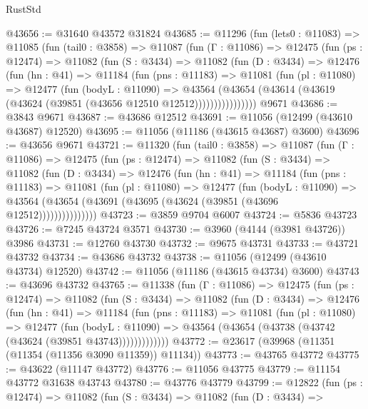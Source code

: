 \begin{lexlean}{RustStd}
\begin{coremodule}
@43656 := @31640 @43572 @31824
@43685 := @11296
    (fun (lets0 : @11083) =>
    @11085
      (fun (tail0 : @3858) =>
      @11087
        (fun (Γ : @11086) =>
        @12475
          (fun (ps : @12474) =>
          @11082
            (fun (S : @3434) =>
            @11082
              (fun (D : @3434) =>
              @12476
                (fun (hn : @41) =>
                @11184
                  (fun (pns : @11183) =>
                  @11081
                    (fun (pl : @11080) =>
                    @12477
                      (fun (bodyL : @11090) =>
                      @43564
                        (@43654
                          (@43614 (@43619 (@43624 (@39851 (@43656 @12510 @12512))))))))))))))))
    @9671
@43686 := @3843 @9671
@43687 := @43686 @12512
@43691 := @11056 (@12499 (@43610 @43687) @12520)
@43695 := @11056 (@11186 (@43615 @43687) @3600)
@43696 := @43656 @9671
@43721 := @11320
    (fun (tail0 : @3858) =>
    @11087
      (fun (Γ : @11086) =>
      @12475
        (fun (ps : @12474) =>
        @11082
          (fun (S : @3434) =>
          @11082
            (fun (D : @3434) =>
            @12476
              (fun (hn : @41) =>
              @11184
                (fun (pns : @11183) =>
                @11081
                  (fun (pl : @11080) =>
                  @12477
                    (fun (bodyL : @11090) =>
                    @43564 (@43654 (@43691 (@43695 (@43624 (@39851 (@43696 @12512)))))))))))))))
@43723 := @3859 @9704 @6007
@43724 := @5836 @43723
@43726 := @7245 @43724 @3571
@43730 := @3960 (@4144 (@3981 @43726)) @3986
@43731 := @12760 @43730
@43732 := @9675 @43731
@43733 := @43721 @43732
@43734 := @43686 @43732
@43738 := @11056 (@12499 (@43610 @43734) @12520)
@43742 := @11056 (@11186 (@43615 @43734) @3600)
@43743 := @43696 @43732
@43765 := @11338
    (fun (Γ : @11086) =>
    @12475
      (fun (ps : @12474) =>
      @11082
        (fun (S : @3434) =>
        @11082
          (fun (D : @3434) =>
          @12476
            (fun (hn : @41) =>
            @11184
              (fun (pns : @11183) =>
              @11081
                (fun (pl : @11080) =>
                @12477
                  (fun (bodyL : @11090) =>
                  @43564 (@43654 (@43738 (@43742 (@43624 (@39851 @43743)))))))))))))
@43772 := @23617 (@39968 (@11351 (@11354 (@11356 @3090 @11359)) @11134))
@43773 := @43765 @43772
@43775 := @43622 (@11147 @43772)
@43776 := @11056 @43775
@43779 := @11154 @43772 @31638 @43743
@43780 := @43776 @43779
@43799 := @12822
    (fun (ps : @12474) =>
    @11082
      (fun (S : @3434) =>
      @11082
        (fun (D : @3434) =>

\end{coremodule}
\end{lexlean}
